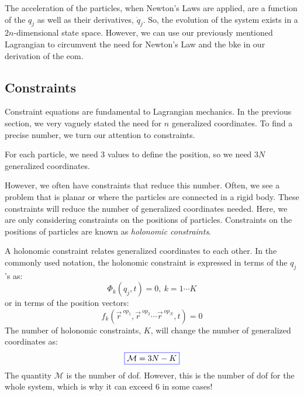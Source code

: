 \documentclass[12pt]{report}
\begin{document}
The acceleration of the particles, when Newton's Laws are applied, are a function of the $q_j$ as well as their derivatives, $\dot{q}_j$. So, the evolution of the system exists in a $2n$-dimensional state space. However, we can use our previously mentioned \gls{Lagrangian} to circumvent the need for Newton's Law and the \gls{bke} in our derivation of the \gls{eom}.

\subsection{Constraints}\label{sec:constaints}
Constraint equations are fundamental to \gls{Lagrangian} mechanics. In the previous section, we very vaguely stated the need for $n$ generalized coordinates. To find a precise number, we turn our attention to constraints.

For each particle, we need 3 values to define the position, so we need $3N$ generalized coordinates. 

However, we often have constraints that reduce this number. Often, we see a problem that is planar or where the particles are connected in a rigid body. These constraints will reduce the number of generalized coordinates needed. Here, we are only considering constraints on the positions of particles. Constraints on the positions of particles are known as \textit{holonomic constraints}. 

A holonomic constraint relates generalized coordinates to each other. In the commonly used notation, the holonomic constraint is expressed in terms of the $q_j$'s as:
$$\Phi_k\left(q_j,t\right)=0, \ k=1\cdots K$$
or in terms of the position vectors:
$$f_k\left(\vec{r}^{\ op_1},\vec{r}^{\ op_2}\cdots \vec{r}^{\ op_N},t\right)=0$$
The number of holonomic constraints, $K$, will change the number of generalized coordinates as:
\begin{gather}\label{eq:dof}
\color{blue}\boxed{\color{black}\mathcal{M}=3N-K}\color{black}
\end{gather}
The quantity $\mathcal{M}$ is the number of \gls{dof}. However, this is the number of \gls{dof} for the whole system, which is why it can exceed 6 in some cases!
\end{document}
